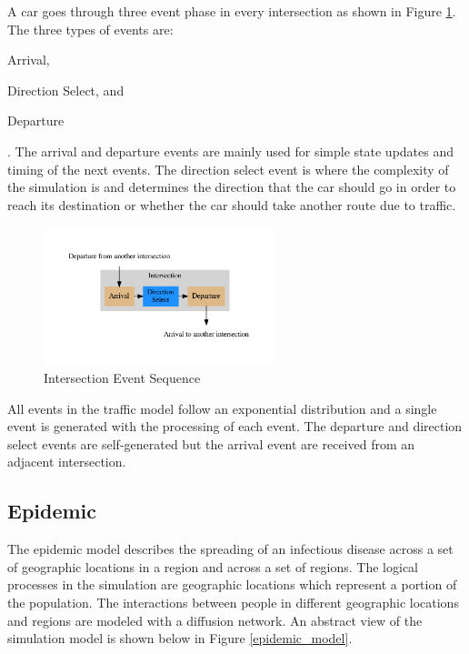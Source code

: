 \documentclass[11pt]{book}
\begin{document}
A car goes through three event phase in every intersection as shown in Figure
\ref{traffic_events}.  The three types of events are: \begin{inparaenum}[(1)] \item Arrival,
\item Direction Select, and \item Departure \end{inparaenum}.  The arrival and departure events are
mainly used for simple state updates and timing of the next events.  The direction select event is
where the complexity of the simulation is and determines the direction that the car should go in
order to reach its destination or whether the car should take another route due to traffic.

\begin{figure}
    \centering
    \includegraphics[width=0.6\textwidth,quiet]{figs/graphviz/traffic_events.pdf}
    \caption{Intersection Event Sequence}\label{traffic_events}
\end{figure}

All events in the traffic model follow an exponential distribution and a single event is generated
with the processing of each event.  The departure and direction select events are self-generated but
the arrival event are received from an adjacent intersection.

\subsection{Epidemic}

The epidemic model describes the spreading of an infectious disease across a set of geographic
locations in a region and across a set of regions.  The logical processes in the simulation are
geographic locations which represent a portion of the population.  The interactions between people
in different geographic locations and regions are modeled with a diffusion network.  An abstract
view of the simulation model is shown below in Figure \ref{epidemic_model}.
\end{document}
